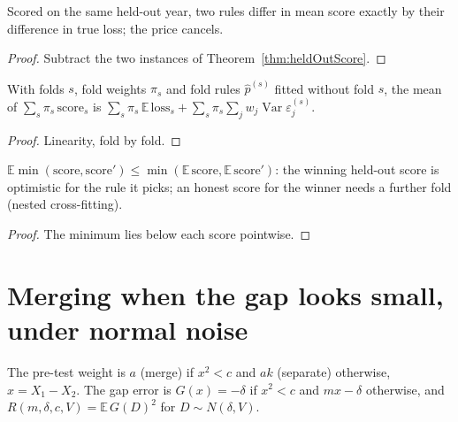 \begin{corollary}\label{cor:heldOutScore_sub}
  \leanok
  Scored on the same held-out year, two rules differ in mean score exactly by
  their difference in true loss; the price cancels.
\end{corollary}
\begin{proof}
  \leanok
  Subtract the two instances of Theorem~\ref{thm:heldOutScore}.
\end{proof}

\begin{corollary}\label{cor:crossFitScore}
  \leanok
  With folds $s$, fold weights $\pi_s$ and fold rules $\hat p^{(s)}$ fitted
  without fold $s$, the mean of $\sum_s \pi_s\,\mathrm{score}_s$ is
  $\sum_s\pi_s\,\mathbb E\,\mathrm{loss}_s + \sum_s\pi_s\sum_j w_j\operatorname{Var}\varepsilon^{(s)}_j$.
\end{corollary}
\begin{proof}
  \leanok
  Linearity, fold by fold.
\end{proof}

\begin{lemma}\label{lem:integral_min_score_le}
  \leanok
  $\mathbb E\min(\mathrm{score}, \mathrm{score}') \le \min(\mathbb E\,\mathrm{score}, \mathbb E\,\mathrm{score}')$:
  the winning held-out score is optimistic for the rule it picks; an honest
  score for the winner needs a further fold (nested cross-fitting).
\end{lemma}
\begin{proof}
  \leanok
  The minimum lies below each score pointwise.
\end{proof}

\section{Merging when the gap looks small, under normal noise}

\begin{definition}\label{def:pretest}
  \leanok
  The pre-test weight is $a$ (merge) if $x^2 < c$ and $ak$ (separate)
  otherwise, $x = X_1 - X_2$. The gap error is $G(x) = -\delta$ if $x^2 < c$ and
  $mx - \delta$ otherwise, and $R(m, \delta, c, V) = \mathbb E\,G(D)^2$ for
  $D \sim N(\delta, V)$.
\end{definition}

